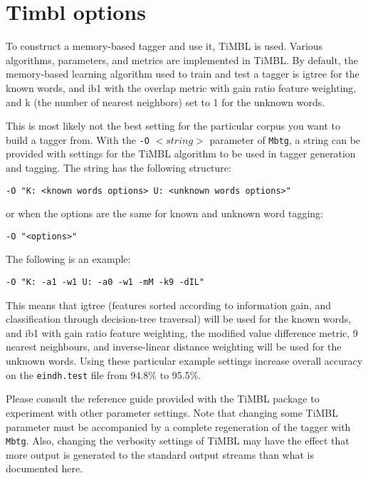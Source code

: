 \documentclass{report}
\begin{document}
\section{Timbl options}

To construct a memory-based tagger and use it, TiMBL is
used. Various algorithms, parameters, and metrics are implemented in
TiMBL. By default, the memory-based learning algorithm used to
train and test a tagger is {\sc igtree} for the known words, and {\sc
ib1} with the overlap metric with gain ratio feature weighting, and k
(the number of nearest neighbors) set to 1 for the unknown words.

This is most likely not the best setting for the particular corpus you
want to build a tagger from.  With the {\tt -O} $<string>$ parameter
of {\tt Mbtg}, a string can be provided with settings for the TiMBL
algorithm to be used in tagger generation and tagging. The string has
the following structure:

{\small
\begin{verbatim}
-O "K: <known words options> U: <unknown words options>" 
\end{verbatim}
}

or when the options are the same for known and unknown word tagging: 

{\small
\begin{verbatim}
-O "<options>"
\end{verbatim}
}

The following is an example: 

{\small
\begin{verbatim}
-O "K: -a1 -w1 U: -a0 -w1 -mM -k9 -dIL" 
\end{verbatim}
}

This means that {\sc igtree} (features sorted according to information
gain, and classification through decision-tree traversal) will be used
for the known words, and {\sc ib1} with gain ratio feature weighting,
the modified value difference metric, 9 nearest neighbours, and
inverse-linear distance weighting will be used for the unknown
words. Using these particular example settings increase
overall accuracy on the {\tt eindh.test} file from 94.8\% to 95.5\%.

Please consult the reference guide provided with the TiMBL
package \cite{Daelemans+07} to experiment with other parameter settings. Note that
changing some TiMBL parameter must be accompanied by a complete
regeneration of the tagger with {\tt Mbtg}. Also, changing the
verbosity settings of TiMBL may have the effect that more output
is generated to the standard output streams than what is documented here.



\end{document}

